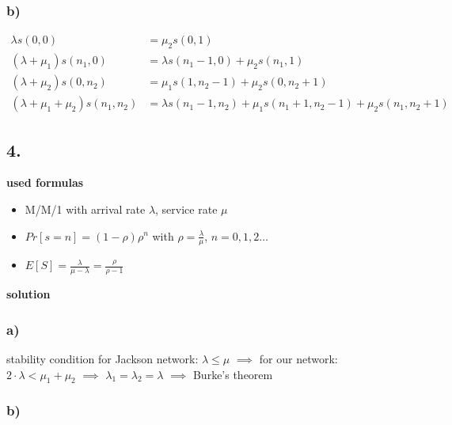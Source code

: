 \subsubsection*{b)}

\begin{align*}
\lambda s ( 0,0 ) &= \mu _ { 2 } s ( 0,1 )\\
\left( \lambda + \mu _ { 1 } \right) s \left( n _ { 1 } , 0 \right) &= \lambda s \left( n _ { 1 } - 1,0 \right) + \mu _ { 2 } s \left( n _ { 1 } , 1 \right)\\
\left( \lambda + \mu _ { 2 } \right) s \left( 0 , n _ { 2 } \right) &= \mu _ { 1 } s \left( 1 , n _ { 2 } - 1 \right) + \mu _ { 2 } s \left( 0 , n _ { 2 } + 1 \right)\\
\left( \lambda + \mu _ { 1 } + \mu _ { 2 } \right) s \left( n _ { 1 } , n _ { 2 } \right) &= \lambda s \left( n _ { 1 } - 1 , n _ { 2 } \right) + \mu _ { 1 } s \left( n _ { 1 } + 1 , n _ { 2 } - 1 \right) + \mu _ { 2 } s \left( n _ { 1 } , n _ { 2 } + 1 \right)
\end{align*}

\subsection*{4.}

\textbf{used formulas}

\begin{itemize}
\item  M/M/1 with arrival rate $\lambda $, service rate $\mu $
\item  $Pr\left[s=n\right]=\left(1-\rho \right)\rho ^{n}$ with $\rho =\frac{\lambda }{\mu }$, $n=0,1,2\ldots$ 
\item $E\left[S\right]=\frac{\lambda }{\mu -\lambda }=\frac{\rho }{\rho -1}$
\end{itemize}

\textbf{solution}

\subsubsection*{ a) }

stability condition for Jackson network: $\lambda \le \mu $
$\implies $ for our network: $2\cdot \lambda < \mu _{1}+\mu _{2}$  $\implies $ $\lambda _{1}=\lambda _{2}=\lambda $
$\implies $ Burke's theorem

\subsubsection*{ b) }

